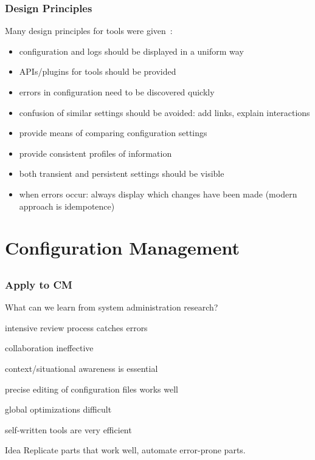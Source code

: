\begin{frame}
	\frametitle{Design Principles \cite{haber2007design}}

	Many design principles for tools were given~\cite{haber2007design}:

	\begin{itemize}[<+-| alert@+>]
	\item configuration and logs should be displayed in a uniform way
	\item APIs/plugins for tools should be provided
	\item errors in configuration need to be discovered quickly
	\item confusion of similar settings should be avoided: add links, explain interactions
	\item provide means of comparing configuration settings
	\item provide consistent profiles of information
	\item both transient and persistent settings should be visible
	\item when errors occur: always display which changes have been made (modern approach is idempotence)
	\end{itemize}
\end{frame}





\section{Configuration Management}

\subsection{}

\begin{frame}
	\frametitle{Apply to CM}

	What can we learn from system administration research?

	\begin{description}[<+-| alert@+>] %
	\item[$+$] intensive review process catches errors
	\item[$-$] collaboration ineffective
	\item[$-$] context/situational awareness is essential
	\item[$+$] precise editing of configuration files works well
	\item[$-$] global optimizations difficult
	\item[$+$] self-written tools are very efficient
	\end{description}

	\pause[\thebeamerpauses]  %

	\begin{alertblock}{Idea}
	Replicate parts that work well, automate error-prone parts.
	\end{alertblock}
\end{frame}

